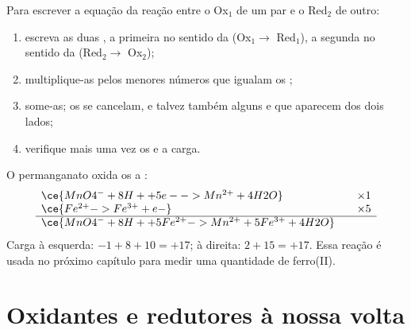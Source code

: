\begin{method}\label{met:g11:redox:combine}
Para escrever a equação da reação entre o  Ox$_1$ de um par e o
 Red$_2$ de outro:
\begin{enumerate}
  \item escreva as duas , a primeira no sentido da 
        (Ox$_1 \to$ Red$_1$), a segunda no sentido da 
        (Red$_2 \to$ Ox$_2$);
  \item multiplique-as pelos menores números que igualam os ;
  \item some-as; os  se cancelam, e talvez também alguns
         e  que aparecem dos dois lados;
  \item verifique mais uma vez os  e a carga.
\end{enumerate}
\end{method}

\begin{example}\label{ex:g11:redox:mno4-fe}
O  permanganato oxida os   a :
\[
\begin{array}{l@{\qquad}l}
  \ce{MnO4^- + 8H+ + 5e- -> Mn^{2+} + 4H2O} & \times 1\\
  \ce{Fe^{2+} -> Fe^{3+} + e-} & \times 5\\
  \hline
  \ce{MnO4^- + 8H+ + 5Fe^{2+} -> Mn^{2+} + 5Fe^{3+} + 4H2O} &
\end{array}
\]
Carga à esquerda: $-1 + 8 + 10 = +17$; à direita: $2 + 15 = +17$. Essa
reação é usada no próximo capítulo para medir uma quantidade de
ferro(II).
\end{example}

\section{Oxidantes e redutores à nossa volta}

